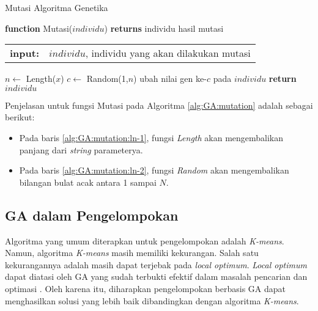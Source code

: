 \begin{algorithm}[H]	
	\caption{Mutasi Algoritma Genetika}
	\label{alg:GA:mutation}
	\begin{flushleft}
		\textbf{function} Mutasi($individu$) \textbf{returns} individu hasil mutasi
		\begin{flushleft}
			\begin{tabular}{ l l }
				\textbf{input:}& $individu$, individu yang akan dilakukan mutasi
				\hspace{5pt} 
			\end{tabular} 
		\end{flushleft}
	\end{flushleft}
	
	\begin{algorithmic}[1]
		\STATE $n \leftarrow$ Length($x$) \label{alg:GA:mutation:ln-1}
		\STATE $c \leftarrow$ Random(1,$n$) \label{alg:GA:mutation:ln-2} 
		\STATE ubah nilai gen ke-$c$ pada $individu$  \label{alg:GA:mutation:ln-3}
		\STATE \textbf{return} {$individu$} \label{alg:GA:mutation:ln-4}
	\end{algorithmic}
\end{algorithm}

Penjelasan untuk fungsi Mutasi pada Algoritma \ref{alg:GA:mutation} adalah sebagai berikut:
\begin{itemize}
	\item Pada baris \ref{alg:GA:mutation:ln-1}, fungsi \textit{Length} akan mengembalikan panjang dari \textit{string} parameterya.
	\item Pada baris \ref{alg:GA:mutation:ln-2}, fungsi \textit{Random} akan mengembalikan bilangan bulat acak antara 1 sampai $N$.
\end{itemize}

\subsection{GA dalam Pengelompokan}
Algoritma yang umum diterapkan untuk pengelompokan adalah \textit{K-means}. Namun, algoritma \textit{K-means} masih memiliki kekurangan. Salah satu kekurangannya adalah masih dapat terjebak pada \textit{local optimum}. \textit{Local optimum} dapat diatasi oleh GA yang sudah terbukti efektif dalam masalah pencarian dan optimasi \cite{srinivas1994genetic}. Oleh karena itu, diharapkan pengelompokan berbasis GA dapat menghasilkan solusi yang lebih baik dibandingkan dengan algoritma \textit{K-means}.

